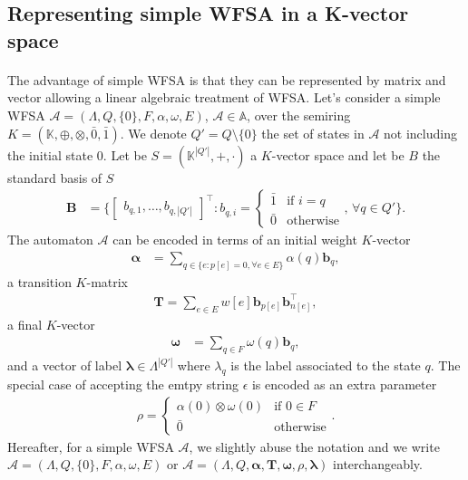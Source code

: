 \subsection{Representing simple WFSA in a K-vector space}
\paragraph{} The advantage of simple WFSA is that they can be represented by matrix and vector allowing a linear algebraic treatment of WFSA. Let's consider a simple WFSA $\mathcal{A} = (\Lambda, Q, \{0\}, F, \alpha, \omega, E)$, $\mathcal{A} \in \mathbb{A}$, over the semiring $K = (\mathbb{K}, \oplus, \otimes, \bar{0}, \bar{1})$. We denote $Q' = Q \setminus \{0\}$ the set of states in $\mathcal{A}$ not including the initial state $0$. Let be $S = (\mathbb{K}^{|Q'|}, +, \cdot)$ a $K$-vector space and let be $B$ the standard basis of $S$
\begin{align}
    \mathbf{B} &= \{ \begin{bmatrix} b_{q,1}, \dots, b_{q,|Q'|} \end{bmatrix}^\top : b_{q,i} = \begin{cases} \bar{1} & \text{if $i = q$} \\ \bar{0} & \text{otherwise} \end{cases}\text{, } \forall q \in Q' \}.
\end{align}
The automaton $\mathcal{A}$ can be encoded in terms of an initial weight $K$-vector
\begin{align}
    \boldsymbol{\alpha} &= \sum_{q \in \{e : p[e] = 0, \forall e \in E\}} \alpha(q) \mathbf{b}_{q}, 
\end{align}
a transition $K$-matrix 
\begin{align}
    \mathbf{T} = \sum_{e \in E} w[e] \mathbf{b}_{p[e]} \mathbf{b}_{n[e]}^\top,
\end{align}
a final $K$-vector 
\begin{align}
    \boldsymbol{\omega} &= \sum_{q \in F} \omega(q) \mathbf{b}_{q},
\end{align}
and a vector of label $\boldsymbol{\lambda} \in \Lambda^{|Q'|}$ where $\lambda_q$ is the label associated to the state $q$. The special case of accepting the emtpy string $\epsilon$ is encoded as an extra parameter
\begin{align}
    \rho = \begin{cases}
     \alpha(0) \otimes \omega(0) & \text{if $0 \in F$} \\
     \bar{0} & \text{otherwise}
    \end{cases}.
\end{align}
Hereafter, for a simple WFSA $\mathcal{A}$, we slightly abuse the notation and we write $\mathcal{A} = (\Lambda, Q, \{0\}, F, \alpha, \omega, E)$ or $\mathcal{A} = (\Lambda, Q, \boldsymbol{\alpha}, \mathbf{T}, \boldsymbol{\omega}, \rho, \boldsymbol{\lambda})$ interchangeably.


